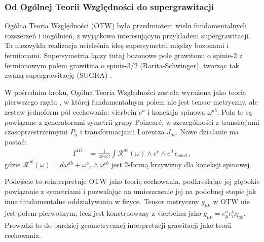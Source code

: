 \documentclass[12pt,a4paper]{article}
\begin{document}
\subsubsection{Od Ogólnej Teorii Względności do supergrawitacji}

Ogólna Teoria Względności (OTW) była przedmiotem wielu fundamentalnych rozszerzeń i uogólnień, z wyjątkowo interesującym przykładem supergrawitacji. Ta niezwykła realizacja ucieleśnia ideę supersymetrii między bozonami i fermionami. Supersymetria łączy tutaj bozonowe pole grawitonu o spinie-$2$ z fermionowym polem grawitina o spinie-$3/2$ (Rarita-Schwinger), tworząc tak zwaną supergrawitację (SUGRA) \cite{Freedman:1976xh, VanNieuwenhuizen:1981ae, Townsend:1977qa}.

W pośrednim kroku, Ogólna Teoria Względności została wyrażona jako teoria pierwszego rzędu \cite{Hassaine:2016amq}, w której fundamentalnym polem nie jest tensor metryczny, ale zestaw jednoform pól cechowania: vierbein $e^a$ i koneksja spinowa $\omega^{ab}$. Pola te są powiązane z generatorami symetrii grupy Poincar\'e, w szczególności z translacjami czasoprzestrzennymi $P_a$ i transformacjami Lorentza $J_{ab}$. Nowe działanie ma postać:
\begin{align}\label{Einstein}
	I^{4D} &=\frac{1}{32\pi G}\int \mathcal{R}^{ab} (\omega)\wedge e^{c}\wedge e^{d}\,\epsilon_{a b c d} \,,
\end{align}
gdzie $\mathcal{R}^{ab}(\omega) = d\omega^{ab} + \omega^a{}_c \wedge \omega^{cb}$ jest 2-formą krzywizny dla koneksji spinowej.

Podejście to reinterpretuje OTW jako teorię cechowania, podkreślając jej głębokie powiązanie z symetriami i pozwalając na umieszczenie jej na podobnej stopie jak inne fundamentalne oddziaływania w fizyce. Tensor metryczny $g_{\mu\nu}$ w OTW nie jest polem pierwotnym, lecz jest konstruowany z vierbeinu \cite{Durka:2012wd} jako $g_{\mu\nu} = e^a_\mu e^b_\nu \eta_{ab}$. Prowadzi to do bardziej geometrycznej interpretacji grawitacji jako teorii cechowania.
\end{document}

